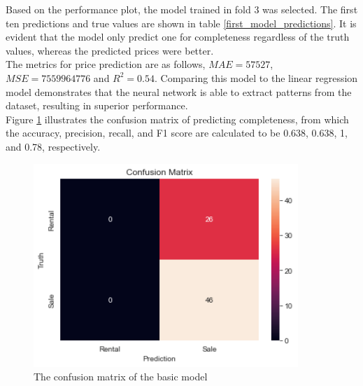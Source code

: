 \documentclass[12pt,twoside]{report}
\begin{document}
Based on the performance plot, the model trained in fold 3 was selected. The first ten predictions and true values are shown in table \ref{first_model_predictions}. It is evident that the model only predict one for completeness regardless of the truth values, whereas the predicted prices were better.  
\\

The metrics for price prediction are as follows, $MAE = 57527$, $MSE = 7559964776$ and $R^2 = 0.54$. Comparing this model to the linear regression model demonstrates that the neural network is able to extract patterns from the dataset, resulting in superior performance. 
\\

Figure \ref{confusion_matrix_basic_model} illustrates the confusion matrix of predicting completeness, from which the accuracy, precision, recall, and F1 score are calculated to be 0.638, 0.638, 1, and 0.78, respectively. 
\\

\begin{figure}[h]
	\centering
	\includegraphics[width=10cm]{confusion_matrix_basic_model}
	\caption{The confusion matrix of the basic model}
	\label{confusion_matrix_basic_model}
\end{figure}
\end{document}
